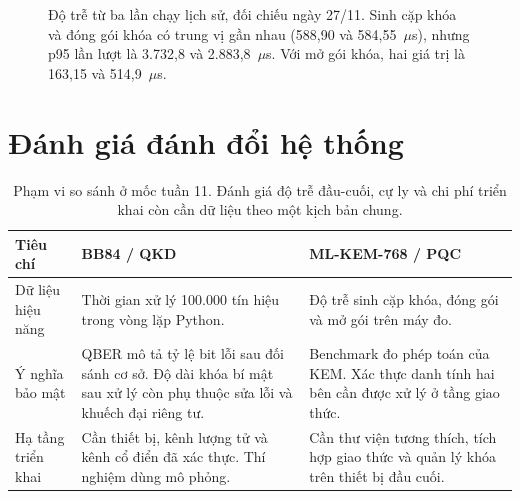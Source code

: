\documentclass[11pt,a4paper]{article}
\begin{document}
\begin{figure}[ht]
\centering
{}
\caption{Độ trễ từ ba lần chạy lịch sử, đối chiếu ngày 27/11. Sinh cặp khóa và đóng gói khóa có trung vị gần nhau (588,90 và 584,55~$\mu$s), nhưng p95 lần lượt là 3.732,8 và 2.883,8~$\mu$s. Với mở gói khóa, hai giá trị là 163,15 và 514,9~$\mu$s.}
\end{figure}

\clearpage
\section{Đánh giá đánh đổi hệ thống}
\begin{table}[ht]
\centering\small
\begin{tabularx}{\linewidth}{@{}p{.17\linewidth}XX@{}}
\toprule
\textbf{Tiêu chí} & \textbf{BB84 / QKD} & \textbf{ML-KEM-768 / PQC}\\
\midrule
Dữ liệu hiệu năng & Thời gian xử lý 100.000 tín hiệu trong vòng lặp Python. & Độ trễ sinh cặp khóa, đóng gói và mở gói trên máy đo.\\
Ý nghĩa bảo mật & QBER mô tả tỷ lệ bit lỗi sau đối sánh cơ sở. Độ dài khóa bí mật sau xử lý còn phụ thuộc sửa lỗi và khuếch đại riêng tư. & Benchmark đo phép toán của KEM. Xác thực danh tính hai bên cần được xử lý ở tầng giao thức.\\
Hạ tầng triển khai & Cần thiết bị, kênh lượng tử và kênh cổ điển đã xác thực. Thí nghiệm dùng mô phỏng. & Cần thư viện tương thích, tích hợp giao thức và quản lý khóa trên thiết bị đầu cuối.\\
\bottomrule
\end{tabularx}
\caption{Phạm vi so sánh ở mốc tuần 11. Đánh giá độ trễ đầu-cuối, cự ly và chi phí triển khai còn cần dữ liệu theo một kịch bản chung.}
\end{table}
\end{document}
